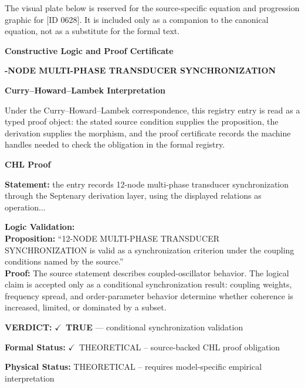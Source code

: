 \begingroup\footnotesize\sloppy
The visual plate below is reserved for the source-specific equation and progression graphic for [ID 0628]. It is included only as a companion to the canonical equation, not as a substitute for the formal text.
\par\endgroup
\ifTZPDarkEdition
{}
\fi

\clearpage
\begingroup\tzpsupportsetup
\noindent\textbf{\fontsize{10.8pt}{12.8pt}\selectfont [ID 0628] Constructive Logic and Proof Certificate}\par
\noindent\textbf{\fontsize{10pt}{12pt}-NODE MULTI-PHASE TRANSDUCER SYNCHRONIZATION}\par
\vspace{0.45em}
\begingroup
\footnotesize
\setlength{\parskip}{0.22em}
\setlength{\parindent}{0pt}
\noindent\textbf{Curry--Howard--Lambek Interpretation}\par
Under the Curry--Howard--Lambek correspondence, this registry entry is read as a typed proof
object: the stated source condition supplies the proposition, the derivation supplies the
morphism, and the proof certificate records the machine handles needed to check the obligation
in the formal registry.

\vspace{0.45em}
\noindent\textbf{CHL Proof}\par
\textbf{Statement:} the entry records 12-node multi-phase transducer synchronization through the Septenary
derivation layer, using the displayed relations as operation...

\textbf{Logic Validation:}\\
\textbf{Proposition:} ``12-NODE MULTI-PHASE TRANSDUCER SYNCHRONIZATION is valid as a synchronization criterion
under the coupling conditions named by the source.''\\
\textbf{Proof:} The source statement describes coupled-oscillator behavior. The logical claim is
accepted only as a conditional synchronization result: coupling weights, frequency
spread, and order-parameter behavior determine whether coherence is increased, limited,
or dominated by a subset.

\textbf{VERDICT:} \ensuremath{\checkmark}\ \textbf{TRUE} --- conditional synchronization validation

\textbf{Formal Status:} \ensuremath{\checkmark}\ THEORETICAL -- source-backed CHL proof obligation

\textbf{Physical Status:} THEORETICAL -- requires model-specific empirical interpretation
\par\vspace{0.45em}
\par
\ifTZPDarkEdition
{}
\fi
\endgroup
\endgroup
